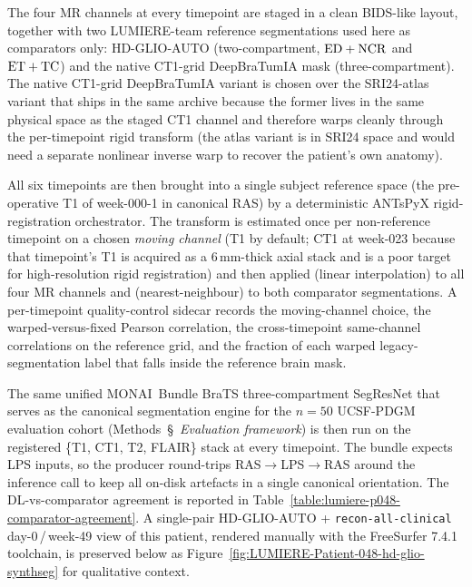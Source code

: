 \documentclass[a4paper,11pt,leqno]{article}
\begin{document}
The four MR channels at every timepoint are staged in a clean
BIDS-like layout, together with two LUMIERE-team reference segmentations
used here as comparators only: HD-GLIO-AUTO (two-compartment,
${\rm ED+NCR}$ and ${\rm ET+TC}$) and the native CT1-grid
DeepBraTumIA mask (three-compartment). The native CT1-grid
DeepBraTumIA variant is chosen over the SRI24-atlas variant that ships
in the same archive because the former lives in the same physical
space as the staged CT1 channel and therefore warps cleanly through the
per-timepoint rigid transform (the atlas variant is in SRI24 space and
would need a separate nonlinear inverse warp to recover the patient's
own anatomy).

All six timepoints are then brought into a single subject
reference space (the pre-operative T1 of week-000-1 in canonical RAS)
by a deterministic ANTsPyX rigid-registration orchestrator. The
transform is estimated once per non-reference timepoint on a chosen
\emph{moving channel} (T1 by default; CT1 at week-023 because that
timepoint's T1 is acquired as a $6$\,mm-thick axial stack and is a
poor target for high-resolution rigid registration) and then applied
(linear interpolation) to all four MR channels and (nearest-neighbour)
to both comparator segmentations. A per-timepoint quality-control
sidecar records the moving-channel choice, the warped-versus-fixed
Pearson correlation, the cross-timepoint same-channel correlations on
the reference grid, and the fraction of each warped legacy-segmentation
label that falls inside the reference brain mask.

The same unified MONAI~Bundle BraTS three-compartment SegResNet
that serves as the canonical segmentation engine for the $n=50$
UCSF-PDGM evaluation cohort (Methods~\S~\emph{Evaluation framework})
is then run on the registered \{T1, CT1, T2, FLAIR\} stack at every timepoint. The bundle expects LPS inputs, so the producer round-trips
RAS$\rightarrow$LPS$\rightarrow$RAS around the inference call to keep
all on-disk artefacts in a single canonical orientation. The
DL-vs-comparator agreement is reported in
Table~\ref{table:lumiere-p048-comparator-agreement}. A single-pair
HD-GLIO-AUTO + \texttt{recon-all-clinical} day-0\,/\,week-49 view of
this patient, rendered manually with the FreeSurfer 7.4.1 toolchain,
is preserved below as
Figure~\ref{fig:LUMIERE-Patient-048-hd-glio-synthseg} for qualitative
context.\\




\vspace{2mm}
\end{document}
